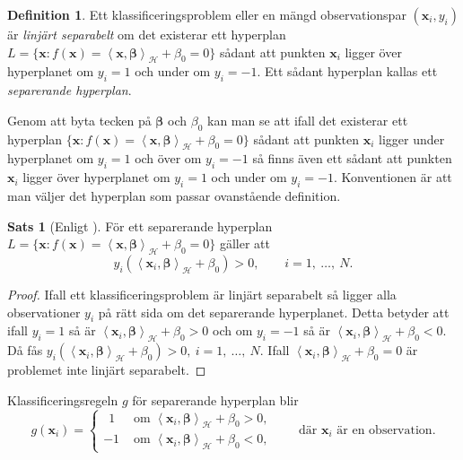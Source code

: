 \documentclass[a4paper, 12pt]{report}
\theoremstyle{definition}
\newtheorem{thm}{Sats}[section]
\newtheorem{defi}{Definition}[section]
\theoremstyle{remark}
\newtheorem*{rem}{Observation}
\newcommand{\bfbeta}{{\boldsymbol{\beta}}}
\newcommand{\bfx}{\mathbf{x}}
\newcommand{\llangle}{\left\langle}
\newcommand{\rrangle}{\right\rangle}
\newcommand{\sephyp}{\{ \mathbf{x} : f\left(\mathbf{x}\right)=\inner{\bfx}{\bfbeta}_\mathcal{H} + \beta_0=0\}}
\newcommand{\inner}[2]{\llangle #1, #2 \rrangle}
\newcommand{\hil}{\mathcal{H}}
\begin{document}
\begin{defi}
	Ett klassificeringsproblem eller en mängd observationspar $\left(\mathbf{x}_i, y_i\right)$ är \textit{linjärt separabelt} om det existerar ett hyperplan $L=\sephyp$ sådant att punkten $\bfx_i$ ligger över hyperplanet om $y_i=1$ och under om $y_i=-1$. Ett sådant hyperplan kallas ett \emph{separerande hyperplan}.
\end{defi}
	Genom att byta tecken på $\bfbeta$ och $\beta_0$ kan man se att ifall det existerar ett hyperplan $\sephyp$ sådant att punkten $\bfx_i$ ligger under hyperplanet om $y_i=1$ och över om $y_i=-1$ så finns även ett sådant att punkten $\bfx_i$ ligger över hyperplanet om $y_i=1$ och under om $y_i=-1$.
	Konventionen är att man väljer det hyperplan som passar ovanstående definition.
\begin{thm}[Enligt \cite{Boyd}]\label{thm:sephyppositive}
	För ett separerande hyperplan $L=\sephyp$ gäller att 
	\begin{equation*}
		y_i\left(\inner{\bfx_i}{\bfbeta}_\hil + \beta_0\right) > 0, \qquad i = 1,~\dots,~N.
	\end{equation*}
\end{thm}
\begin{proof}
	Ifall ett klassificeringsproblem är linjärt separabelt så ligger alla observationer $y_i$ på rätt sida om det separerande hyperplanet. Detta betyder att ifall $y_i=1$ så är $\inner{\bfx_i}{\bfbeta}_\hil + \beta_0 > 0$ och om $y_i=-1$ så är $\inner{\bfx_i}{\bfbeta}_\hil + \beta_0 < 0$.
	Då fås $y_i\left(\inner{\bfx_i}{\bfbeta}_\hil + \beta_0\right) > 0,~i = 1,~\dots,~N.$ Ifall $\inner{\bfx_i}{\bfbeta}_\hil + \beta_0 = 0$ är problemet inte linjärt separabelt.
\end{proof}

Klassificeringsregeln $g$ för separerande hyperplan blir
\begin{equation*}
g\left(\mathbf{x}_i\right)=  
\begin{cases}
~~ 1 &\text{ om } \inner{\bfx_i}{\bfbeta}_\hil + \beta_0 > 0,\\
-1 &\text{ om } \inner{\bfx_i}{\bfbeta}_\hil + \beta_0 < 0,
\end{cases}\qquad\text{där }\bfx_i\text{ är en observation.}
\end{equation*}
\end{document}
